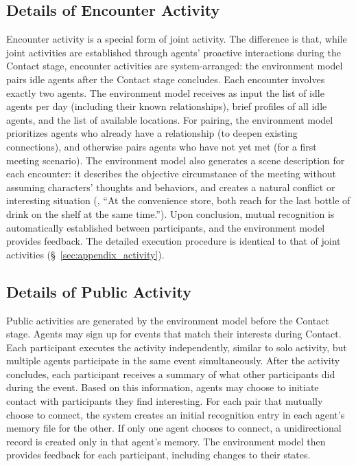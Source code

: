\subsection{Details of Encounter Activity}
\label{sec:appendix_encounter_activity}

Encounter activity is a special form of joint activity.
The difference is that, while joint activities are established through agents' proactive interactions during the Contact stage, encounter activities are system-arranged: the environment model pairs idle agents after the Contact stage concludes.
Each encounter involves exactly two agents.
The environment model receives as input the list of idle agents per day (including their known relationships), brief profiles of all idle agents, and the list of available locations.
For pairing, the environment model prioritizes agents who already have a relationship (to deepen existing connections), and otherwise pairs agents who have not yet met (for a first meeting scenario).
The environment model also generates a scene description for each encounter: it describes the objective circumstance of the meeting without assuming characters' thoughts and behaviors, and creates a natural conflict or interesting situation (\eg, ``At the convenience store, both reach for the last bottle of drink on the shelf at the same time.'').
Upon conclusion, mutual recognition is automatically established between participants, and the environment model provides feedback.
The detailed execution procedure is identical to that of joint activities (\S~\ref{sec:appendix_activity}).

\subsection{Details of Public Activity}
\label{sec:appendix_public_activity}

Public activities are generated by the environment model before the Contact stage. Agents may sign up for events that match their interests during Contact.
Each participant executes the activity independently, similar to solo activity, but multiple agents participate in the same event simultaneously.
After the activity concludes, each participant receives a summary of what other participants did during the event.
Based on this information, agents may choose to initiate contact with participants they find interesting.
For each pair that mutually choose to connect, the system creates an initial recognition entry in each agent's memory file for the other.
If only one agent chooses to connect, a unidirectional record is created only in that agent's memory.
The environment model then provides feedback for each participant, including changes to their states.




